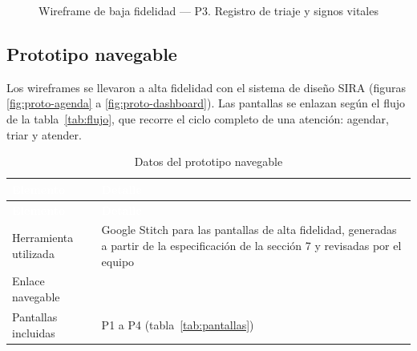 \documentclass[11pt,a4paper]{article}
\newcommand{\cab}[1]{\textcolor{white}{\textbf{#1}}}
\newcommand{\fila}{\rule{0pt}{2.2em}}
\newcommand{\wflin}[3]{\draw[wflinea] (#1,#2) -- ++(#3,0);}
\newcommand{\wfboton}[5]{%
  \draw[draw=black!70, fill=white, rounded corners=2pt] (#1,#2) rectangle (#3,#4);
  \node[font=\scriptsize\bfseries\sffamily] at ({(#1+#3)/2},{(#2+#4)/2}) {#5};}
\newcommand{\wfprimario}[5]{%
  \draw[wfoscuro, rounded corners=2pt] (#1,#2) rectangle (#3,#4);
  \node[font=\scriptsize\bfseries\sffamily, text=white] at ({(#1+#3)/2},{(#2+#4)/2}) {#5};}
\begin{document}
\begin{figure}[!htbp]
{}
\caption{Wireframe de baja fidelidad --- P3. Registro de triaje y signos vitales}
\label{fig:wf-triaje}
\end{figure}

\clearpage
\subsection{Prototipo navegable}

Los wireframes se llevaron a alta fidelidad con el sistema de diseño SIRA (figuras
\ref{fig:proto-agenda} a \ref{fig:proto-dashboard}). Las pantallas se enlazan según el flujo de
la tabla~\ref{tab:flujo}, que recorre el ciclo completo de una atención: agendar, triar y atender.

\begin{xltabular}{\linewidth}{|P{4.5cm}|L|}
  \caption{Datos del prototipo navegable}\label{tab:prototipo}\\
  \hline
  \cab{Elemento} & \cab{Detalle} \\ \hline
  \endfirsthead
  \hline
  \cab{Elemento} & \cab{Detalle} \\ \hline
  \endhead
  Herramienta utilizada & Google Stitch para las pantallas de alta fidelidad, generadas a partir de
                          la especificación de la sección 7 y revisadas por el equipo \\ \hline
  \fila Enlace navegable & \\ \hline
  Pantallas incluidas   & P1 a P4 (tabla~\ref{tab:pantallas}) \\ \hline
\end{xltabular}
\end{document}
